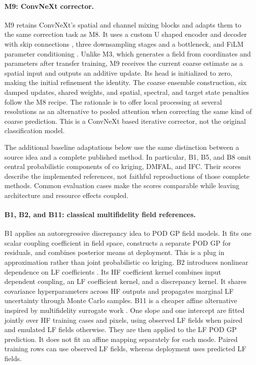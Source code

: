 \paragraph{M9: ConvNeXt corrector.}
M9 retains ConvNeXt's spatial and channel mixing blocks \citep{liu2022convnext}
and adapts them to the same correction task as M8. It uses a custom U shaped
encoder and decoder with skip connections \citep{ronneberger2015}, three
downsampling stages and a bottleneck,
and FiLM parameter conditioning \citep{perez2018}. Unlike M3, which generates
a field from coordinates and parameters after transfer training, M9 receives
the current coarse estimate as a spatial input and outputs an additive update.
Its head is initialized to zero, making the initial refinement the identity.
The coarse ensemble construction, six damped updates, shared weights, and
spatial, spectral, and target state penalties follow the M8 recipe. The rationale
is to offer local processing at several resolutions as an alternative to pooled
attention when correcting the same kind of coarse prediction. This is a
ConvNeXt based iterative corrector, not the original classification model.

The additional baseline adaptations below use the same distinction between a
source idea and a complete published method. In particular, B1, B5, and B8 omit
central probabilistic components of co kriging, DMFAL, and IFC. Their scores
describe the implemented references, not faithful reproductions of those
complete methods. Common evaluation cases make the scores comparable while
leaving architecture and resource effects coupled.

\paragraph{B1, B2, and B11: classical multifidelity field references.}
B1 applies an autoregressive discrepancy idea \citep{kennedy2000} to POD GP field
models. It fits one scalar coupling coefficient in field space, constructs a
separate POD GP for residuals, and combines posterior means at deployment.
This is a plug in approximation rather than joint probabilistic co kriging.
B2 introduces nonlinear dependence on LF coefficients \citep{perdikaris2017}.
Its HF coefficient kernel combines input dependent coupling, an LF coefficient
kernel, and a discrepancy kernel. It shares covariance hyperparameters across
HF outputs and propagates marginal LF uncertainty through Monte Carlo samples.
B11 is a cheaper affine alternative inspired by multifidelity surrogate work
\citep{zhang2018}. One slope and one intercept are fitted jointly over HF training cases and
pixels, using observed LF fields when paired and emulated LF fields otherwise.
They are then applied to the LF POD GP prediction.
It does not fit an affine mapping separately for each mode. Paired training rows
can use observed LF fields, whereas deployment uses predicted LF fields.

